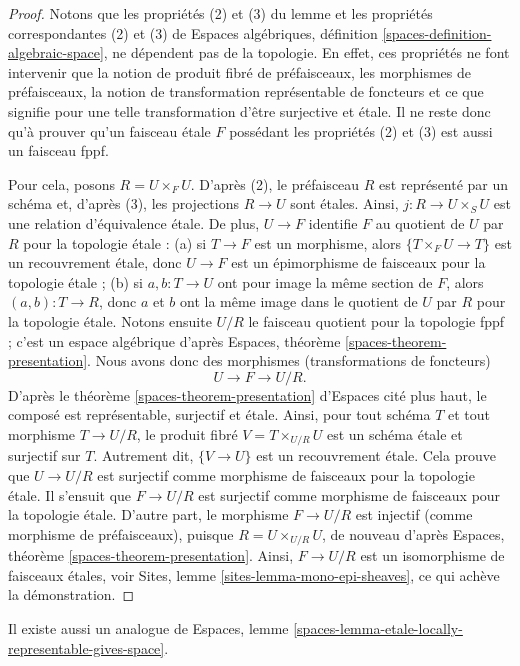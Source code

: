 \begin{proof}
Notons que les propriétés (2) et (3) du lemme et les propriétés correspondantes
(2) et (3) de
Espaces algébriques, définition \ref{spaces-definition-algebraic-space},
ne dépendent pas de la topologie. En effet, ces propriétés
ne font intervenir que la notion de produit fibré de préfaisceaux, les morphismes de
préfaisceaux, la notion de transformation représentable de foncteurs
et ce que signifie pour une telle transformation d'être surjective et étale.
Il ne reste donc qu'à prouver qu'un faisceau étale $F$ possédant les propriétés
(2) et (3) est aussi un faisceau fppf.

\medskip\noindent
Pour cela, posons $R = U \times_F U$. D'après (2), le préfaisceau $R$ est représenté
par un schéma et, d'après (3), les projections $R \to U$ sont étales. Ainsi,
$j : R \to U \times_S U$ est une relation d'équivalence étale. De plus,
$U \to F$ identifie $F$ au quotient de $U$ par $R$ pour la
topologie étale : (a) si $T \to F$ est un morphisme, alors $\{T \times_F U \to T\}$
est un recouvrement étale, donc $U \to F$ est un épimorphisme de faisceaux pour la
topologie étale ; (b) si $a, b : T \to U$ ont pour image la même section de $F$,
alors $(a, b) : T \to R$, donc $a$ et $b$ ont la même image dans le quotient
de $U$ par $R$ pour la topologie étale. Notons ensuite $U/R$ le faisceau quotient
pour la topologie fppf ; c'est un espace algébrique d'après
Espaces, théorème \ref{spaces-theorem-presentation}.
Nous avons donc des morphismes (transformations de foncteurs)
$$
U \to F \to U/R.
$$
D'après le
théorème \ref{spaces-theorem-presentation} d'Espaces cité plus haut,
le composé est représentable, surjectif et étale. Ainsi, pour tout
schéma $T$ et tout morphisme $T \to U/R$, le produit fibré $V = T \times_{U/R} U$
est un schéma étale et surjectif sur $T$. Autrement dit, $\{V \to U\}$
est un recouvrement étale. Cela prouve que $U \to U/R$ est surjectif comme
morphisme de faisceaux pour la topologie étale. Il s'ensuit que
$F \to U/R$ est surjectif comme morphisme de faisceaux pour la topologie étale.
D'autre part, le morphisme $F \to U/R$ est injectif (comme morphisme de préfaisceaux),
puisque $R = U \times_{U/R} U$, de nouveau d'après
Espaces, théorème \ref{spaces-theorem-presentation}.
Ainsi, $F \to U/R$ est un isomorphisme de faisceaux étales, voir
Sites, lemme \ref{sites-lemma-mono-epi-sheaves},
ce qui achève la démonstration.
\end{proof}

\noindent
Il existe aussi un analogue de
Espaces, lemme \ref{spaces-lemma-etale-locally-representable-gives-space}.

